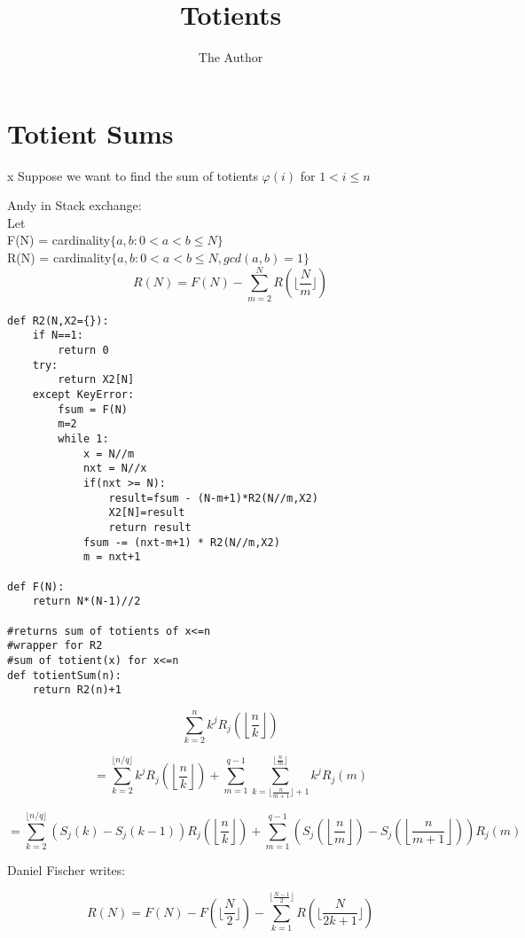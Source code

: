 \documentclass[11pt]{amsart}
\title{Totients}
\author{The Author}
\begin{document}
\maketitle
\section{Totient Sums}
x
Suppose we want to find the sum of totients $\varphi(i)$ for $1<i\le n$

Andy in Stack exchange:\\

Let\\
F(N) = cardinality$\{ a,b : 0 <a < b \le N \}$\\
R(N) = cardinality$\{ a,b : 0 < a < b \le N, gcd(a,b) = 1 \}$\\

$$R(N)=F(N)-\sum^N_{m=2}R(\lfloor\frac{N}{m}\rfloor)$$

\begin{verbatim}
def R2(N,X2={}):
    if N==1:
        return 0
    try:
        return X2[N]
    except KeyError:
        fsum = F(N)
        m=2
        while 1:
            x = N//m
            nxt = N//x
            if(nxt >= N):
                result=fsum - (N-m+1)*R2(N//m,X2)
                X2[N]=result
                return result
            fsum -= (nxt-m+1) * R2(N//m,X2)
            m = nxt+1

def F(N):
    return N*(N-1)//2
    
#returns sum of totients of x<=n
#wrapper for R2
#sum of totient(x) for x<=n
def totientSum(n):
    return R2(n)+1
\end{verbatim}

$$\sum\limits_{k=2}^n k^j R_j\left ( \left \lfloor \frac{n}{k} \right \rfloor \right )$$

$$= \sum\limits_{k=2}^{\lfloor n/q \rfloor} k^j R_j\left ( \left \lfloor \frac{n}{k} \right \rfloor \right ) + \sum\limits_{m=1}^{q-1} \sum\limits_{k=\lfloor \frac{n}{m+1} \rfloor + 1}^{\lfloor \frac{n}{m} \rfloor} k^j R_j(m)$$

$$= \sum\limits_{k=2}^{\lfloor n/q \rfloor} (S_j(k) - S_j(k-1)) R_j\left ( \left \lfloor \frac{n}{k} \right \rfloor \right ) + \sum\limits_{m=1}^{q-1} \left ( S_j \left ( \left \lfloor \frac{n}{m} \right \rfloor \right ) - S_j \left ( \left \lfloor \frac{n}{m+1} \right \rfloor \right ) \right ) R_j(m)$$


Daniel Fischer writes:

$$R(N) = F(N) - F\left( \Big\lfloor \frac{N}{2} \Big\rfloor \right)  - \sum_{k=1}^{\lfloor\frac{N-1}{2}\rfloor}{ R\left(\Big\lfloor\frac{N}{2k+1}\Big\rfloor\right) }$$
\end{document}
